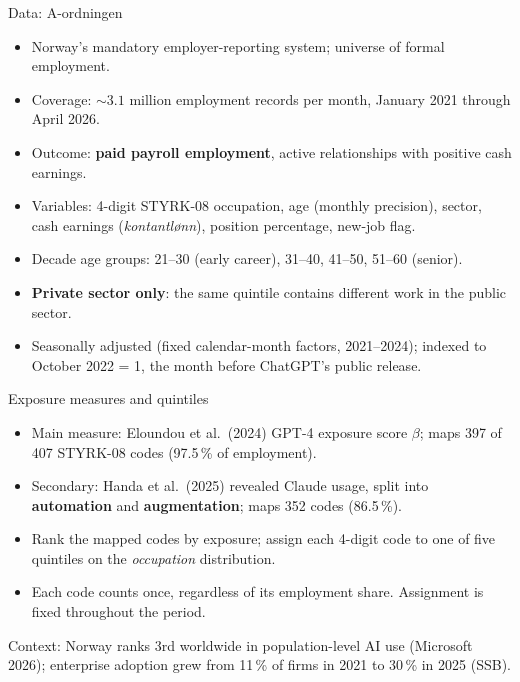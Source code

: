 
\begin{frame}{Data: A-ordningen}
\begin{itemize}\setlength{\itemsep}{4pt}
  \item Norway's mandatory employer-reporting system; universe of formal employment.
  \item Coverage: $\sim 3.1$ million employment records per month, January 2021 through April 2026.
  \item Outcome: \textbf{paid payroll employment}, active relationships with positive cash earnings.
  \item Variables: 4-digit STYRK-08 occupation, age (monthly precision), sector, cash earnings (\emph{kontantlønn}), position percentage, new-job flag.
  \item Decade age groups: 21--30 (early career), 31--40, 41--50, 51--60 (senior).
  \item \textbf{Private sector only}: the same quintile contains different work in the public sector.
  \item Seasonally adjusted (fixed calendar-month factors, 2021--2024); indexed to October 2022 = 1, the month before ChatGPT's public release.
\end{itemize}
\end{frame}

\begin{frame}{Exposure measures and quintiles}
\begin{itemize}\setlength{\itemsep}{6pt}
  \item Main measure: Eloundou et al.\ (2024) GPT-4 exposure score $\beta$; maps 397 of 407 STYRK-08 codes (97.5\,\% of employment).
  \item Secondary: Handa et al.\ (2025) revealed Claude usage, split into \textbf{automation} and \textbf{augmentation}; maps 352 codes (86.5\,\%).
  \item Rank the mapped codes by exposure; assign each 4-digit code to one of five quintiles on the \emph{occupation} distribution.
  \item Each code counts once, regardless of its employment share. Assignment is fixed throughout the period.
\end{itemize}

\vspace{0.4em}
\footnotesize
Context: Norway ranks 3rd worldwide in population-level AI use (Microsoft 2026); enterprise adoption grew from 11\,\% of firms in 2021 to 30\,\% in 2025 (SSB).
\end{frame}
